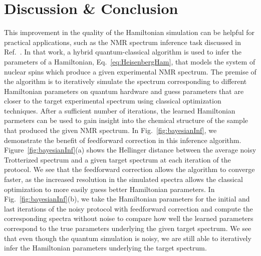 \documentclass[prx,aps,twocolumn,showpacs,superscriptaddress,10pt]{revtex4-1}
\begin{document}
\section{Discussion \& Conclusion}
\label{sec:Discussion}

This improvement in the quality of the Hamiltonian simulation can be helpful for practical applications, such as the NMR spectrum inference task discussed in Ref.~\cite{Sels2020}. In that work, a hybrid quantum-classical algorithm is used to infer the parameters of a Hamiltonian, Eq.~\eqref{eq:HeisenbergHam}, that models the system of nuclear spins which produce a given experimental NMR spectrum. The premise of the algorithm is to iteratively simulate the spectrum corresponding to different Hamiltonian parameters on quantum hardware and guess parameters that are closer to the target experimental spectrum using classical optimization techniques. After a sufficient number of iterations, the learned Hamiltonian parmeters can be used to gain insight into the chemical structure of the sample that produced the given NMR spectrum. In Fig.~\ref{fig:bayesianInf}, we demonstrate the benefit of feedforward correction in this inference algorithm. Figure~\ref{fig:bayesianInf}(a) shows the Hellinger distance between the average noisy Trotterized spectrum  and a given target spectrum at each iteration of the protocol. We see that the feedforward correction allows the algorithm to converge faster, as the increased resolution in the simulated spectra allows the classical optimization to more easily guess better Hamiltonian parameters. In Fig.~\ref{fig:bayesianInf}(b), we take the Hamiltonian parameters for the initial and last iterations of the noisy protocol with feedforward correction and compute the corresponding spectra without noise to compare how well the learned parameters correspond to the true parameters underlying the given target spectrum. We see that even though the quantum simulation is noisy, we are still able to iteratively infer the Hamiltonian parameters underlying the target spectrum.

\end{document}
